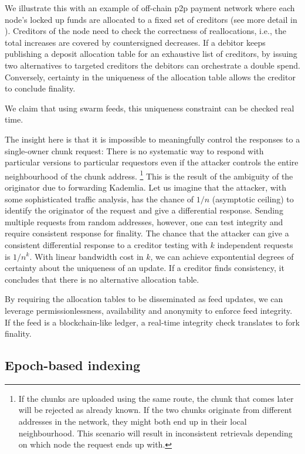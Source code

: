 We illustrate this with an example of off-chain p2p payment network where each node's locked up funds are allocated to a fixed set of creditors (see more detail in \cite{ethersphere2019swap}). Creditors of the node need to check the correctness of reallocations, i.e., the total increases are covered by countersigned decreases. 
If a debitor keeps publishing a deposit allocation table for an exhaustive list of creditors, by issuing two alternatives to targeted creditors the debitors can orchestrate a double spend. Conversely, certainty in the uniqueness of the allocation table allows the creditor to conclude finality.

We claim that using swarm feeds, this uniqueness constraint  can be checked real time.

The insight here is that it is impossible to meaningfully control the responses to a single-owner chunk request: There is no systematic way to respond with particular versions to particular requestors even if the attacker controls the entire neighbourhood of the chunk address.%
%
\footnote{If the chunks are uploaded using the same route, the chunk that comes later will be rejected as already known. If the two chunks originate from different addresses in the network, they might both end up in their local neighbourhood. This scenario will result in inconsistent retrievals depending on which node the request ends up with.}
%
This is the result of the ambiguity of the originator due to forwarding Kademlia. Let us imagine that the attacker, with some sophisticated traffic analysis, has the chance of $1/n$ (asymptotic ceiling) to identify the originator of the request and give a differential response. Sending multiple requests from random addresses, however, one can test integrity and require consistent response for finality. The chance that the attacker can give a consistent differential response to a creditor testing with $k$ independent requests is $1/n^k$. With linear bandwidth cost in $k$, we can achieve expontential degrees of certainty about the uniqueness of an update. If a creditor finds consistency, it concludes that there is no alternative allocation table.


By requiring the allocation tables to be disseminated as feed updates, we can leverage permissionlessness, availability and anonymity to enforce feed integrity. If the feed is a blockchain-like ledger, a real-time integrity check translates to fork finality. 


\subsection{Epoch-based 
indexing \statusyellow}\label{sec:epoch-based-feeds}

